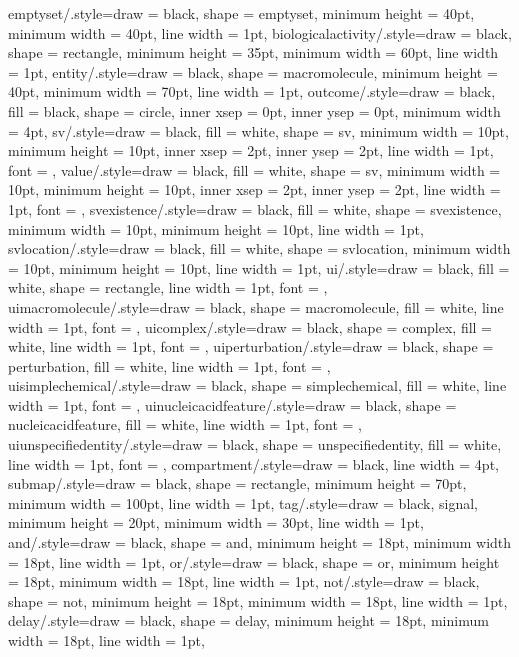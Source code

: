 {    emptyset/.style={draw = black, shape = emptyset, minimum height = 40pt, minimum width = 40pt, line width = 1pt},
    biologicalactivity/.style={draw = black, shape = rectangle, minimum height = 35pt, minimum width = 60pt, line width = 1pt},
    entity/.style={draw = black, shape = macromolecule, minimum height = 40pt, minimum width = 70pt, line width = 1pt},
    outcome/.style={draw = black, fill = black, shape = circle, inner xsep = 0pt, inner ysep = 0pt, minimum width = 4pt},
    sv/.style={draw = black, fill = white, shape = sv, minimum width = 10pt, minimum height = 10pt, inner xsep = 2pt, inner ysep = 2pt, line width = 1pt, font = {\scriptsize\sffamily}},
    value/.style={draw = black, fill = white, shape = sv, minimum width = 10pt, minimum height = 10pt, inner xsep = 2pt, inner ysep = 2pt, line width = 1pt, font = {\scriptsize\sffamily}},
    svexistence/.style={draw = black, fill = white, shape = svexistence, minimum width = 10pt, minimum height = 10pt, line width = 1pt},
    svlocation/.style={draw = black, fill = white, shape = svlocation, minimum width = 10pt, minimum height = 10pt, line width = 1pt},
    ui/.style={draw = black, fill = white, shape = rectangle, line width = 1pt, font = {\scriptsize\sffamily}},
    uimacromolecule/.style={draw = black, shape = macromolecule, fill = white, line width = 1pt, font = {\tiny\sffamily}},
    uicomplex/.style={draw = black, shape = complex, fill = white, line width = 1pt, font = {\tiny\sffamily}},
    uiperturbation/.style={draw = black, shape = perturbation, fill = white, line width = 1pt, font = {\tiny\sffamily}},
    uisimplechemical/.style={draw = black, shape = simplechemical, fill = white, line width = 1pt, font = {\tiny\sffamily}},
    uinucleicacidfeature/.style={draw = black, shape = nucleicacidfeature, fill = white, line width = 1pt, font = {\tiny\sffamily}},
    uiunspecifiedentity/.style={draw = black, shape = unspecifiedentity, fill = white, line width = 1pt, font = {\tiny\sffamily}},
    compartment/.style={draw = black, line width = 4pt},
    submap/.style={draw = black, shape = rectangle, minimum height = 70pt, minimum width = 100pt, line width = 1pt},
    tag/.style={draw = black, signal, minimum height = 20pt, minimum width = 30pt, line width = 1pt},
    and/.style={draw = black, shape = and, minimum height = 18pt, minimum width = 18pt, line width = 1pt},
    or/.style={draw = black, shape = or, minimum height = 18pt, minimum width = 18pt, line width = 1pt},
    not/.style={draw = black, shape = not, minimum height = 18pt, minimum width = 18pt, line width = 1pt},
    delay/.style={draw = black, shape = delay, minimum height = 18pt, minimum width = 18pt, line width = 1pt},
}
